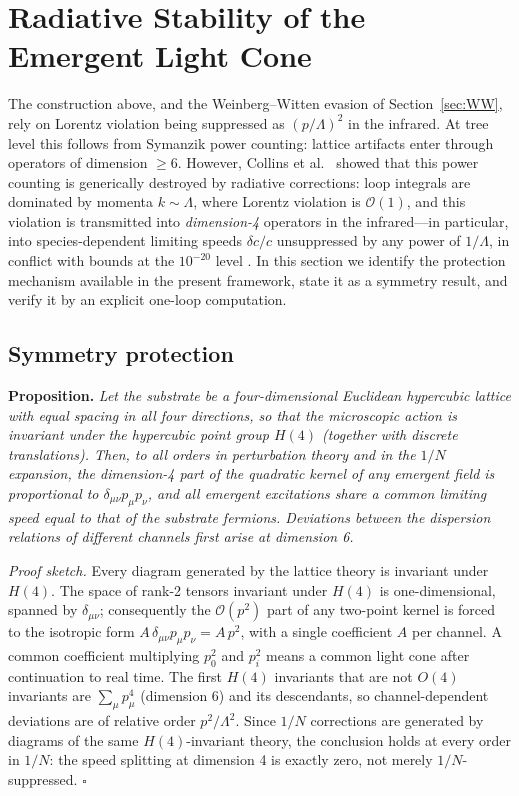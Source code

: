 \documentclass[11pt,a4paper]{article}
\begin{document}
\section{Radiative Stability of the Emergent Light Cone}
\label{sec:lightcone}

The construction above, and the Weinberg--Witten evasion of
Section~\ref{sec:WW}, rely on Lorentz violation being suppressed as
$(p/\Lambda)^2$ in the infrared.
At tree level this follows from Symanzik power counting: lattice
artifacts enter through operators of dimension $\geq 6$.
However, Collins et al.\ \cite{Collins:2004bp} showed that this
power counting is generically destroyed by radiative corrections:
loop integrals are dominated by momenta $k \sim \Lambda$, where
Lorentz violation is $\mathcal{O}(1)$, and this violation is
transmitted into \emph{dimension-4} operators in the
infrared---in particular, into species-dependent limiting speeds
$\delta c/c$ unsuppressed by any power of $1/\Lambda$, in conflict
with bounds at the $10^{-20}$ level \cite{Liberati:2013xla}.
In this section we identify the protection mechanism available in
the present framework, state it as a symmetry result, and verify it
by an explicit one-loop computation.

\subsection{Symmetry protection}

\textbf{Proposition.}
\emph{Let the substrate be a four-dimensional Euclidean hypercubic
lattice with equal spacing in all four directions, so that the
microscopic action is invariant under the hypercubic point group
$H(4)$ (together with discrete translations).
Then, to all orders in perturbation theory and in the $1/N$
expansion, the dimension-4 part of the quadratic kernel of any
emergent field is proportional to $\delta_{\mu\nu}p_\mu p_\nu$,
and all emergent excitations share a common limiting speed equal
to that of the substrate fermions.
Deviations between the dispersion relations of different channels
first arise at dimension 6.}

\emph{Proof sketch.}
Every diagram generated by the lattice theory is invariant under
$H(4)$.
The space of rank-2 tensors invariant under $H(4)$ is
one-dimensional, spanned by $\delta_{\mu\nu}$; consequently the
$\mathcal{O}(p^2)$ part of any two-point kernel is forced to the
isotropic form $A\,\delta_{\mu\nu}p_\mu p_\nu = A\,p^2$, with a
single coefficient $A$ per channel.
A common coefficient multiplying $p_0^2$ and $p_i^2$ means a common
light cone after continuation to real time.
The first $H(4)$ invariants that are not $O(4)$ invariants are
$\sum_\mu p_\mu^4$ (dimension 6) and its descendants, so
channel-dependent deviations are of relative order $p^2/\Lambda^2$.
Since $1/N$ corrections are generated by diagrams of the same
$H(4)$-invariant theory, the conclusion holds at every order in
$1/N$: the speed splitting at dimension 4 is exactly zero, not
merely $1/N$-suppressed. \hfill$\square$
\end{document}
